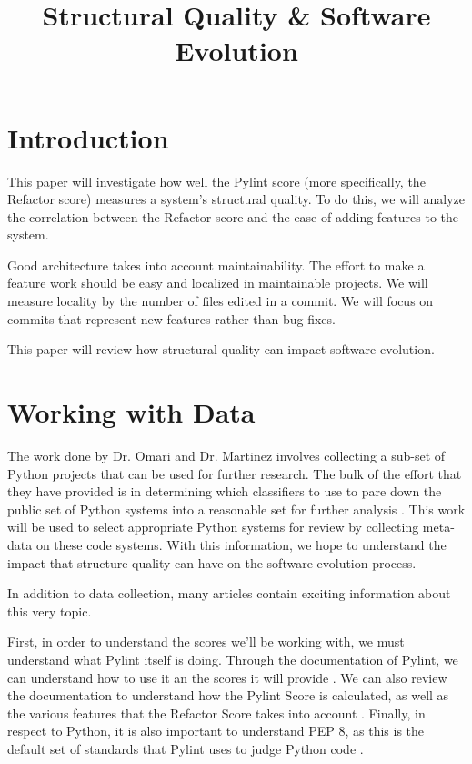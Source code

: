 \documentclass[conference]{IEEEtran}
\begin{document}
\title{Structural Quality \& Software Evolution}

\author{
}

\maketitle

\section{Introduction}
This paper will investigate how well the Pylint score (more specifically, the Refactor score) measures a system's structural quality. To do this, we will analyze the correlation between the Refactor score and the ease of adding features to the system.

Good architecture takes into account maintainability. The effort to make a feature work should be easy and localized in maintainable projects. We will measure locality by the number of files edited in a commit. We will focus on commits that represent new features rather than bug fixes.

This paper will review how structural quality can impact software evolution.

\section{Working with Data}

The work done by Dr. Omari and Dr. Martinez involves collecting a sub-set of Python projects that can be used for further research. The bulk of the effort that they have provided is in determining which classifiers to use to pare down the public set of Python systems into a reasonable set for further analysis \cite{omari:2018}. This work will be used to select appropriate Python systems for review by collecting meta-data on these code systems. With this information, we hope to understand the impact that structure quality can have on the software evolution process.

In addition to data collection, many articles contain exciting information about this very topic.

First, in order to understand the scores we'll be working with, we must understand what Pylint itself is doing. Through the documentation of Pylint, we can understand how to use it an the scores it will provide \cite{pylint:main}. We can also review the documentation to understand how the Pylint Score is calculated, as well as the various features that the Refactor Score takes into account \cite{pylint:score}. Finally, in respect to Python, it is also important to understand PEP 8, as this is the default set of standards that Pylint uses to judge Python code \cite{pylint:pep8}.
\end{document}
